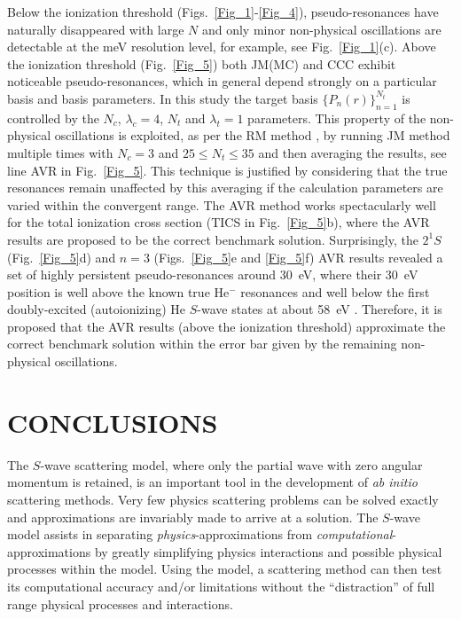 \documentclass[aip
, pra
, showpacs
, aps
, twocolumn
, groupedaddress
, floatfix
]{revtex4}
\begin{document}
Below the ionization threshold (Figs.~\ref{Fig_1}-\ref{Fig_4}), pseudo-resonances have naturally disappeared with large $N$
and only minor non-physical oscillations are detectable at the meV resolution level, for example, see Fig.~\ref{Fig_1}(c).
Above the ionization threshold (Fig.~\ref{Fig_5}) both JM(MC) and CCC exhibit noticeable pseudo-resonances,
which in general depend strongly on a particular basis and basis parameters.
In this study the target basis $\{P_n(r)\}_{n=1}^{N_t}$ is controlled by the $N_c$, $\lambda_c=4$, $N_t$ and $\lambda_t=1$ parameters.
This property of the non-physical oscillations is exploited, as per the RM method \cite{BB97},
by running JM method multiple times with $N_c=3$ and $25 \leq N_t\leq 35$ and then averaging
 the results, see line AVR in Fig.~\ref{Fig_5}.
This technique is justified by considering that the true resonances remain unaffected by this averaging if the calculation parameters are varied within the convergent range.
The AVR method works spectacularly well for the total ionization cross section (TICS in Fig.~\ref{Fig_5}b),
where the AVR results are proposed to be the correct benchmark solution.
Surprisingly, the $2^1S$ (Fig.~\ref{Fig_5}d) and $n=3$ (Figs.~\ref{Fig_5}e and \ref{Fig_5}f) AVR results revealed a set of highly persistent pseudo-resonances around 30~eV,
where their 30~eV position is well above the known true He$^-$ resonances \cite{BC94} and well below the first doubly-excited (autoionizing) He $S$-wave states at about 58~eV \cite{BS10p022715,EUO77}.
Therefore, it is proposed that the AVR results (above the ionization threshold) approximate the correct benchmark solution within the error bar given by the remaining non-physical oscillations.



\section{CONCLUSIONS}


The $S$-wave scattering model, where only the partial wave with zero angular momentum is retained,
is an important tool in the development of {\em ab initio} scattering methods.
Very few physics scattering problems can be solved exactly and approximations are invariably made to arrive at a solution.
The $S$-wave model assists in separating {\em physics}-approximations from {\em computational}-approximations by
greatly simplifying physics interactions and possible physical processes within the model.
Using the model, a scattering method can then test its computational accuracy
and/or limitations without the ``distraction'' of full range physical processes and interactions.
\end{document}
